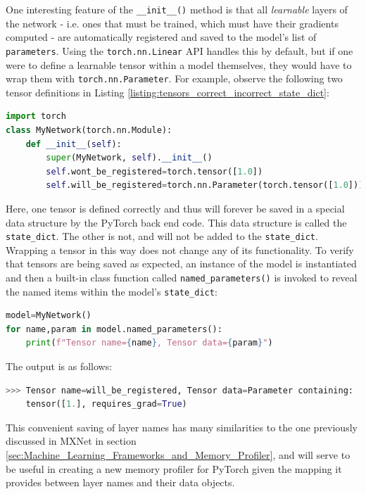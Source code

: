\documentclass[12pt,letterpaper]{article}
\begin{document}
One interesting feature of the \texttt{\_\_init\_\_()} method is that all \textit{learnable} layers of the network - i.e. ones that must be trained, which must have their gradients computed - are automatically registered and saved to the model's list of \texttt{parameters}. Using the \texttt{torch.nn.Linear} API handles this by default, but if one were to define a learnable tensor within a model themselves, they would have to wrap them with \texttt{torch.nn.Parameter}. For example, observe the following two tensor definitions in Listing \ref{listing:tensors_correct_incorrect_state_dict}: 
\begin{lstlisting}[language=Python, caption={Example of how to create a tensor which will be saved in the \texttt{state\_dict} of a model}, label={listing:tensors_correct_incorrect_state_dict}]
import torch
class MyNetwork(torch.nn.Module):
    def __init__(self):
        super(MyNetwork, self).__init__()
        self.wont_be_registered=torch.tensor([1.0])
        self.will_be_registered=torch.nn.Parameter(torch.tensor([1.0]))
\end{lstlisting}
Here, one tensor is defined correctly and thus will forever be saved in a special data structure by the PyTorch back end code. This data structure is called the \texttt{state\_dict}. The other is not, and will not be added to the \texttt{state\_dict}. Wrapping a tensor in this way does not change any of its functionality. To verify that tensors are being saved as expected, an instance of the model is instantiated and then a built-in class function called \texttt{named\_parameters()} is invoked to reveal the named items within the model's \texttt{state\_dict}:
\begin{lstlisting}[language=Python]
model=MyNetwork()
for name,param in model.named_parameters():
    print(f"Tensor name={name}, Tensor data={param}")
\end{lstlisting}
The output is as follows:
\begin{lstlisting}[language=Python]
>>> Tensor name=will_be_registered, Tensor data=Parameter containing:
    tensor([1.], requires_grad=True)
\end{lstlisting}
\par
This convenient saving of layer names has many similarities to the one previously discussed in MXNet in section \ref{sec:Machine_Learning_Frameworks_and_Memory_Profiler}, and will serve to be useful in creating a new memory profiler for PyTorch given the mapping it provides between layer names and their data objects. 
\end{document}
